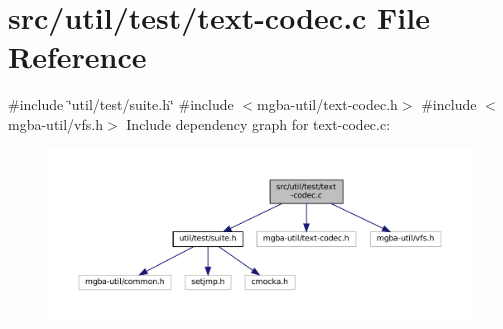 \hypertarget{test_2text-codec_8c}{}\section{src/util/test/text-\/codec.c File Reference}
\label{test_2text-codec_8c}
{\ttfamily \#include \char`\"{}util/test/suite.\+h\char`\"{}}\newline
{\ttfamily \#include $<$mgba-\/util/text-\/codec.\+h$>$}\newline
{\ttfamily \#include $<$mgba-\/util/vfs.\+h$>$}\newline
Include dependency graph for text-\/codec.c\+:
\nopagebreak
\begin{figure}[H]
\begin{center}
\leavevmode
\includegraphics[width=350pt]{test_2text-codec_8c__incl}
\end{center}
\end{figure}
